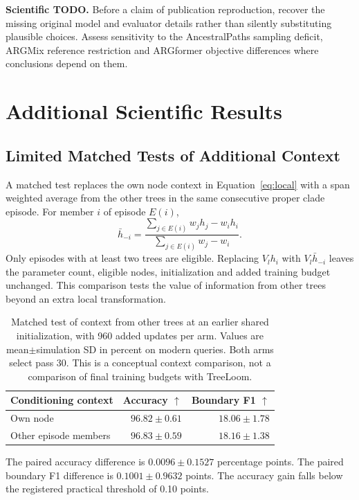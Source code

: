 \documentclass[letterpaper]{article}
\newcommand{\best}[1]{\mathbf{#1}}
\newcommand{\todo}[1]{\par\noindent\textbf{Scientific TODO.} #1\par}
\begin{document}
\todo{Before a claim of publication reproduction, recover the missing original model and evaluator details rather than silently substituting plausible choices. Assess sensitivity to the AncestralPaths sampling deficit, ARGMix reference restriction and ARGformer objective differences where conclusions depend on them.}

\section{Additional Scientific Results}
\subsection{Limited Matched Tests of Additional Context}
A matched test replaces the own node context in Equation~\ref{eq:local} with a span weighted average from the other trees in the same consecutive proper clade episode. For member $i$ of episode $E(i)$,
\begin{equation}
\bar h_{-i}=
\frac{\sum_{j\in E(i)}w_jh_j-w_ih_i}
{\sum_{j\in E(i)}w_j-w_i}.
\end{equation}
Only episodes with at least two trees are eligible. Replacing $V_lh_i$ with $V_l\bar h_{-i}$ leaves the parameter count, eligible nodes, initialization and added training budget unchanged. This comparison tests the value of information from other trees beyond an extra local transformation.

\begin{table}[t]
\centering
\small
\begin{tabular}{@{}lrr@{}}
\toprule
Conditioning context & Accuracy $\uparrow$ & Boundary F1 $\uparrow$\\
\midrule
Own node &$96.82\pm0.61$&$18.06\pm1.78$\\
Other episode members &$\best{96.83\pm0.59}$&$\best{18.16\pm1.38}$\\
\bottomrule
\end{tabular}
\caption{Matched test of context from other trees at an earlier shared initialization, with 960 added updates per arm. Values are mean$\pm$simulation SD in percent on modern queries. Both arms select pass 30. This is a conceptual context comparison, not a comparison of final training budgets with TreeLoom.}
\label{tab:episode}
\end{table}

The paired accuracy difference is $0.0096\pm0.1527$ percentage points. The paired boundary F1 difference is $0.1001\pm0.9632$ points. The accuracy gain falls below the registered practical threshold of 0.10 points.
\end{document}
